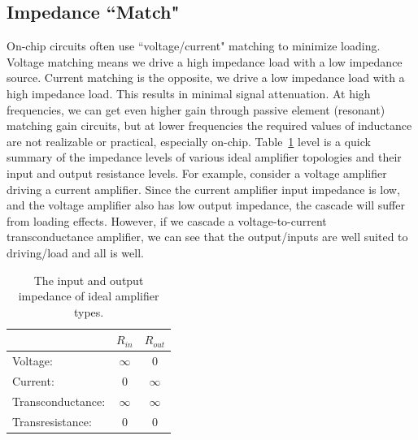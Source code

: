 \subsection{Impedance ``Match"}
On-chip circuits often use ``voltage/current" matching to minimize loading.  Voltage matching means we drive a high impedance load with a low impedance source.  Current matching is the opposite, we drive a low impedance load with a high impedance load.  This results in minimal signal attenuation.  At high frequencies, we can get even higher gain through passive element (resonant) matching gain circuits, but at lower frequencies the required values of inductance are not realizable or practical, especially on-chip.
Table~\ref{tab:imp} level is a quick summary of the impedance levels of various ideal amplifier topologies and their input and output resistance levels.   For example, consider a voltage amplifier driving a current amplifier.  Since the current amplifier input impedance is low, and the voltage amplifier also has low output impedance, the cascade will suffer from loading effects.  However, if we cascade a voltage-to-current transconductance amplifier, we can see that the output/inputs are well suited to driving/load and all is well.
\begin{table}[tb]
\begin{center}
\begin{tabular}{| l | c| c |}
\hline
  &  $R_{in}$ &  $R_{out}$ \\
  \hline
 Voltage: & $\infty$ &  $0$ \\
 Current: & $0$  &  $\infty$ \\
 Transconductance: & $\infty$ &  $\infty$ \\
 Transresistance: & $0$ &  $0$ \\
\hline
\end{tabular}
\end{center}
\caption{The input and output impedance of ideal amplifier types. \label{tab:imp}} 
\end{table}
\section{\topicB}
